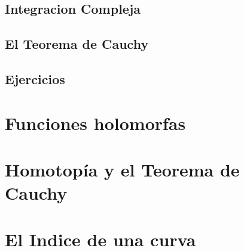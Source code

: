 \documentclass[]{book}
\theoremstyle{definition}
\theoremstyle{definition}
\theoremstyle{definition}
\theoremstyle{remark}
\begin{document}
\hypertarget{integracion-compleja}{%
\section{Integracion Compleja}\label{integracion-compleja}}

\hypertarget{el-teorema-de-cauchy}{%
\section{El Teorema de Cauchy}\label{el-teorema-de-cauchy}}

\hypertarget{ejercicios-3}{%
\section{Ejercicios}\label{ejercicios-3}}

\hypertarget{funciones-holomorfas}{%
\chapter{Funciones holomorfas}\label{funciones-holomorfas}}

\hypertarget{homotopuxeda-y-el-teorema-de-cauchy}{%
\chapter{Homotopía y el Teorema de Cauchy}\label{homotopuxeda-y-el-teorema-de-cauchy}}

\hypertarget{el-indice-de-una-curva}{%
\chapter{El Indice de una curva}\label{el-indice-de-una-curva}}


\end{document}
